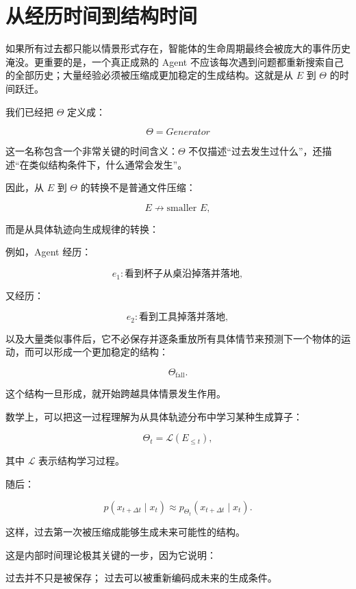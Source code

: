 \section{从经历时间到结构时间}

如果所有过去都只能以情景形式存在，智能体的生命周期最终会被庞大的事件历史淹没。更重要的是，一个真正成熟的 Agent 不应该每次遇到问题都重新搜索自己的全部历史；大量经验必须被压缩成更加稳定的生成结构。这就是从 $E$ 到 $\Theta$ 的时间跃迁。

我们已经把 $\Theta$ 定义成：

\[
\boxed{
\Theta = Generator
}
\]

这一名称包含一个非常关键的时间含义：$\Theta$ 不仅描述“过去发生过什么”，还描述“在类似结构条件下，什么通常会发生”。

因此，从 $E$ 到 $\Theta$ 的转换不是普通文件压缩：

\[
E
\not\rightarrow
\text{smaller }E,
\]

而是从具体轨迹向生成规律的转换：

\begin{statementbox}
\centering
{}
\end{statementbox}

例如，Agent 经历：

\[
e_1:
\text{看到杯子从桌沿掉落并落地},
\]

又经历：

\[
e_2:
\text{看到工具掉落并落地},
\]

以及大量类似事件后，它不必保存并逐条重放所有具体情节来预测下一个物体的运动，而可以形成一个更加稳定的结构：

\[
\Theta_{\mathrm{fall}}.
\]

这个结构一旦形成，就开始跨越具体情景发生作用。

数学上，可以把这一过程理解为从具体轨迹分布中学习某种生成算子：

\[
\Theta_t
=
\mathcal{L}
\left(
E_{\leq t}
\right),
\]

其中 $\mathcal{L}$ 表示结构学习过程。

随后：

\[
p(x_{t+\Delta t}\mid x_t)
\approx
p_{\Theta_t}
(x_{t+\Delta t}\mid x_t).
\]

这样，过去第一次被压缩成能够生成未来可能性的结构。

这是内部时间理论极其关键的一步，因为它说明：

\begin{statementbox}
过去并不只是被保存；
过去可以被重新编码成未来的生成条件。
\end{statementbox}

